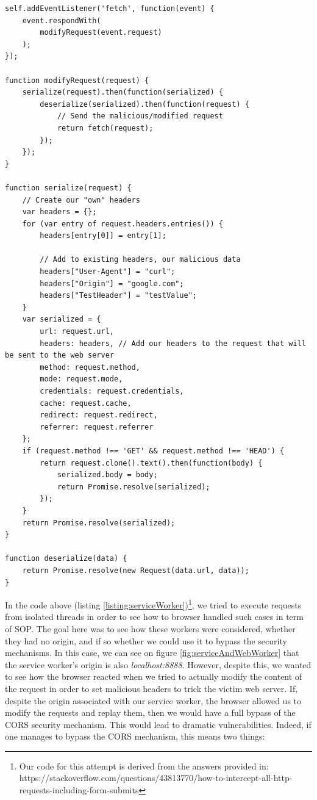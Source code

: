 \documentclass[journal]{IEEEtran}
\begin{document}
\begin{lstlisting}[caption=Trying to set malicious headers with a "malicious" service worker, label={listing:serviceWorker}]
self.addEventListener('fetch', function(event) {
    event.respondWith(
        modifyRequest(event.request)
    );
});

function modifyRequest(request) {
    serialize(request).then(function(serialized) {
        deserialize(serialized).then(function(request) {
            // Send the malicious/modified request
            return fetch(request);
        });
    });
}

function serialize(request) {
    // Create our "own" headers
    var headers = {};
    for (var entry of request.headers.entries()) {
        headers[entry[0]] = entry[1];
        
        // Add to existing headers, our malicious data
        headers["User-Agent"] = "curl";
        headers["Origin"] = "google.com";
        headers["TestHeader"] = "testValue";
    }
    var serialized = {
        url: request.url,
        headers: headers, // Add our headers to the request that will be sent to the web server
        method: request.method,
        mode: request.mode,
        credentials: request.credentials,
        cache: request.cache,
        redirect: request.redirect,
        referrer: request.referrer
    };  
    if (request.method !== 'GET' && request.method !== 'HEAD') {
        return request.clone().text().then(function(body) {
            serialized.body = body;
            return Promise.resolve(serialized);
        });
    }
    return Promise.resolve(serialized);
}

function deserialize(data) {
    return Promise.resolve(new Request(data.url, data));
}
\end{lstlisting}

In the code above (listing \ref{listing:serviceWorker})\footnote{Our code for this attempt is derived from the answers provided in: https://stackoverflow.com/questions/43813770/how-to-intercept-all-http-requests-including-form-submits}, we tried to execute requests from isolated threads in order to see how to browser handled such cases in term of SOP. The goal here was to see how these workers were considered, whether they had no origin, and if so whether we could use it to bypass the security mechanisms. In this case, we can see on figure \ref{fig:serviceAndWebWorker} that the service worker's origin is also \emph{localhost:8888}. However, despite this, we wanted to see how the browser reacted when we tried to actually modify the content of the request in order to set malicious headers to trick the victim web server. If, despite the origin associated with our service worker, the browser allowed us to modify the requests and replay them, then we would have a full bypass of the CORS security mechanism. This would lead to dramatic vulnerabilities. Indeed, if one manages to bypass the CORS mechanism, this means two things:
\end{document}

